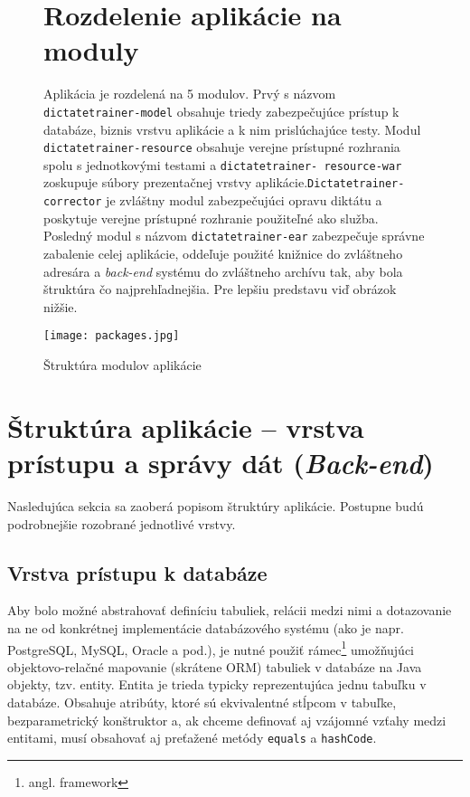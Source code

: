 \documentclass[12pt,oneside]{fithesis2}
\begin{document}
			\begin{figure}
	\section{Rozdelenie aplikácie na moduly}
      	\par Aplikácia je rozdelená na 5 modulov. Prvý s názvom \texttt{dictatetrainer-model} obsahuje triedy zabezpečujúce prístup k databáze, biznis vrstvu aplikácie a k nim prislúchajúce testy. Modul \texttt{dictatetrainer-resource} obsahuje verejne prístupné rozhrania spolu s jednotkovými testami a \texttt{dictatetrainer- resource-war} zoskupuje súbory prezentačnej vrstvy aplikácie.\texttt{Dictatetrainer- corrector} je zvláštny modul zabezpečujúci opravu diktátu a poskytuje verejne prístupné rozhranie použiteľné ako služba. Posledný modul s názvom \texttt{dictatetrainer-ear} zabezpečuje správne zabalenie celej aplikácie, oddeľuje použité knižnice do zvláštneho adresára a \textit{back-end} systému do zvláštneho archívu tak, aby bola štruktúra  čo najprehľadnejšia. Pre lepšiu predstavu viď obrázok nižšie.
      	
\bigskip
	\texttt{[image: packages.jpg]}
	\caption{Štruktúra modulov aplikácie}
	\label{packagediag}
	\end{figure}
	
	\pagebreak
	
    \section{Štruktúra aplikácie -- vrstva prístupu a správy dát (\textit{Back-end})} \label{app-layers}
    
    \par Nasledujúca sekcia sa zaoberá popisom štruktúry aplikácie. Postupne budú podrobnejšie rozobrané jednotlivé vrstvy.
		\subsection{Vrstva prístupu k databáze}
      
      \par Aby bolo možné abstrahovať definíciu tabuliek, relácii medzi nimi a dotazovanie na ne od konkrétnej implementácie databázového systému (ako je napr. PostgreSQL, MySQL, Oracle a pod.), je nutné použiť rámec\footnote{angl. framework} umožňujúci objektovo-relačné mapovanie (skrátene ORM) tabuliek v databáze na Java objekty, tzv. entity. Entita je trieda typicky reprezentujúca jednu tabuľku v databáze. Obsahuje atribúty, ktoré sú ekvivalentné stĺpcom v tabuľke, bezparametrický konštruktor a, ak chceme definovať aj vzájomné vzťahy medzi entitami, musí obsahovať aj preťažené metódy \texttt{equals} a \texttt{hashCode}.
      
\end{document}
